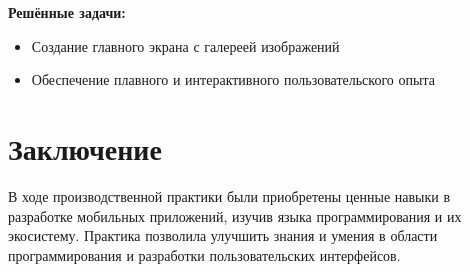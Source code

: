 \documentclass[a4paper, 12pt]{extarticle}
\begin{document}
\textbf{Решённые задачи:}
\begin{itemize}
    \item Создание главного экрана с галереей изображений
    \item Обеспечение плавного и интерактивного пользовательского опыта
\end{itemize}

\section*{Заключение}
В ходе производственной практики были приобретены ценные навыки в разработке мобильных приложений, изучив языка программирования и их экосистему. Практика позволила улучшить знания и умения в области программирования и разработки пользовательских интерфейсов.
\end{document}
